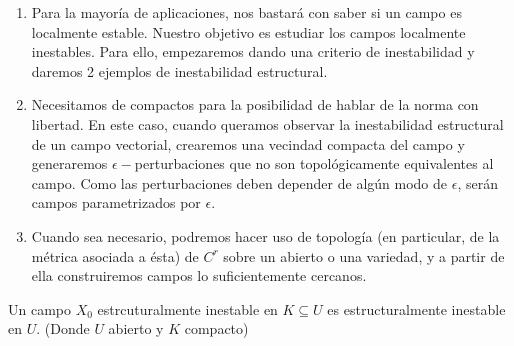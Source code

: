\begin{rmrk}
	\begin{enumerate}
		\item  Para la mayoría de aplicaciones, nos bastará con saber si un campo es localmente estable. Nuestro objetivo es estudiar  los campos localmente inestables. Para ello, empezaremos dando una criterio de inestabilidad y daremos 2 ejemplos de inestabilidad estructural.
		
		\item Necesitamos de compactos para la posibilidad de hablar de la norma con libertad. En este caso, cuando queramos observar la inestabilidad estructural de un campo vectorial, crearemos una vecindad compacta del campo y generaremos $\epsilon-$perturbaciones que no son topológicamente equivalentes al campo. Como las perturbaciones deben depender de algún modo de $\epsilon$, serán campos parametrizados por $\epsilon$. 
		
		\item Cuando sea necesario, podremos hacer uso de topología (en particular, de la métrica asociada a ésta) de $C^r$ sobre un abierto o una variedad, y a partir de ella construiremos campos lo suficientemente cercanos.
	\end{enumerate}
\end{rmrk}



\begin{prop}
	Un campo $X_0$ estrcuturalmente inestable en $K\subseteq U$ es estructuralmente inestable en $U$. (Donde $U$ abierto y $K$ compacto)
\end{prop}

